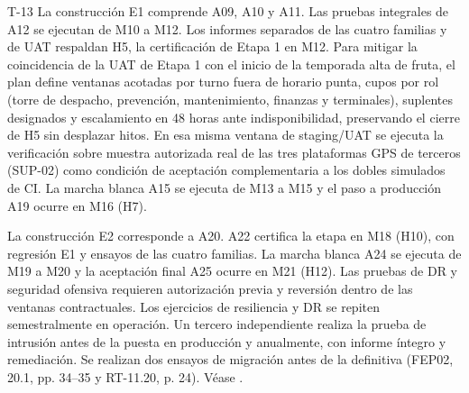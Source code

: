 \begin{formulario}{T-13}
La construcción E1 comprende A09, A10 y A11. Las pruebas integrales de A12 se ejecutan de M10 a M12. Los informes separados de las cuatro familias y de UAT respaldan H5, la certificación de Etapa 1 en M12. Para mitigar la coincidencia de la UAT de Etapa 1 con el inicio de la temporada alta de fruta, el plan define ventanas acotadas por turno fuera de horario punta, cupos por rol (torre de despacho, prevención, mantenimiento, finanzas y terminales), suplentes designados y escalamiento en 48 horas ante indisponibilidad, preservando el cierre de H5 sin desplazar hitos. En esa misma ventana de staging/UAT se ejecuta la verificación sobre muestra autorizada real de las tres plataformas GPS de terceros (SUP-02) como condición de aceptación complementaria a los dobles simulados de CI. La marcha blanca A15 se ejecuta de M13 a M15 y el paso a producción A19 ocurre en M16 (H7).

La construcción E2 corresponde a A20. A22 certifica la etapa en M18 (H10), con regresión E1 y ensayos de las cuatro familias. La marcha blanca A24 se ejecuta de M19 a M20 y la aceptación final A25 ocurre en M21 (H12). Las pruebas de DR y seguridad ofensiva requieren autorización previa y reversión dentro de las ventanas contractuales. Los ejercicios de resiliencia y DR se repiten semestralmente en operación. Un tercero independiente realiza la prueba de intrusión antes de la puesta en producción y anualmente, con informe íntegro y remediación. Se realizan dos ensayos de migración antes de la definitiva (FEP02, 20.1, pp. 34--35 y RT-11.20, p. 24). Véase .
\end{formulario}

